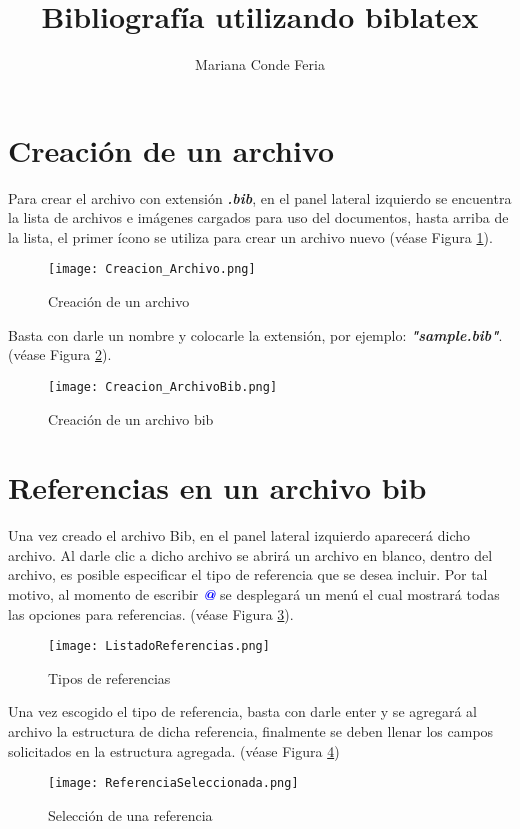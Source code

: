 \documentclass{article}
\title{Bibliografía utilizando biblatex}
\author{Mariana Conde Feria}
\date{}
\begin{document}
\maketitle
\begin{abstract}
    
\end{abstract}

\section{Creación de un archivo}
Para crear el archivo con extensión \textbf{\textit{.bib}}, en el panel lateral izquierdo se encuentra la lista de archivos e imágenes cargados para uso del documentos, hasta arriba de la lista, el primer ícono se utiliza para crear un archivo nuevo (véase Figura \ref{fig:Creacion_Archivo}). 
\begin{figure}[h]
    \centering
    \texttt{[image: Creacion\_Archivo.png]}
    \caption{Creación de un archivo}
    \label{fig:Creacion_Archivo}
\end{figure}

Basta con darle un nombre y colocarle la extensión, por ejemplo: \textbf{\textit{"sample.bib"}}. (véase Figura \ref{fig:Creacion_ArchivoBib}).

\begin{figure}[h]
    \centering
    \texttt{[image: Creacion\_ArchivoBib.png]}
    \caption{Creación de un archivo bib}
    \label{fig:Creacion_ArchivoBib}
\end{figure}
\newpage
\section{Referencias en un archivo bib}
Una vez creado el archivo Bib, en el panel lateral izquierdo aparecerá dicho archivo. Al darle clic a dicho archivo se abrirá un archivo en blanco, dentro del archivo, es posible especificar el tipo de referencia que se desea incluir. Por tal motivo, al momento de escribir \textbf{\textit{\textcolor{blue}{@}}} se desplegará un menú el cual mostrará todas las opciones para referencias. (véase Figura \ref{fig:ListadoReferencias}).
\begin{figure}[h]
    \centering
    \texttt{[image: ListadoReferencias.png]}
    \caption{Tipos de referencias}
    \label{fig:ListadoReferencias}
\end{figure}

Una vez escogido el tipo de referencia, basta con darle enter y se agregará al archivo la estructura de dicha referencia, finalmente se deben llenar los campos solicitados en la estructura agregada. (véase Figura \ref{fig:ReferenciaSeleccionada})
\begin{figure}[h]
    \centering
    \texttt{[image: ReferenciaSeleccionada.png]}
    \caption{Selección de una referencia}
    \label{fig:ReferenciaSeleccionada}
\end{figure}
\end{document}
